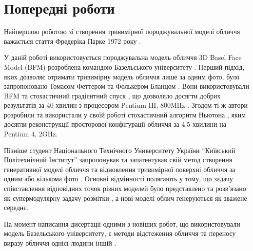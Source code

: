 \section{Попередні роботи}

Найпершою роботою зі створення
тривимірної породжувальної моделі обличчя важається
стаття Фредеріка Парке 1972 року \cite{Parke:1972}.

У даній роботі використовується породжувальна модель обличчя
3D Basel Face Model (BFM)
розроблена командою Базельського університету
\cite{bfm09}.
Перший підхід,
яких дозволяє отримати тривимірну модель обличчя лише за одним фото,
було запропоновано Томасом Феттером та Фолькером Бланцом
\cite{blanz:vetter:1999}.
Вони використовували BFM та стохастичний градієнтний спуск \cite{sgd:1998},
що дозволяло досягти добрих результатів за 40 хвилин з процесором
Pentium III, 800MHz \cite{blanz:romdhani:vetter}.
Згодом ті ж автори розробили та використали у своїй роботі
стохастичний алгоритм Ньютона \cite{blanz:vetter:2003},
яким досягли реконструкції просторової конфігурації обличчя за 4.5 хвилини на
Pentium 4, 2GHz.

Пізніше студент Національного Технічного Университету України
``Київський Політехнічний Інститут'' запропонував та запатентував
свій метод створення генеративної моделі обличчя та відновлення
тривимірної поверхні обличчя за одним або кількома фото \cite{tyshchenko2011}.
Основні відмінності полягають у тому,
що задачу співставлення відповідних точок різних моделей
було представлено та розв'язано як супермодулярну задачу розмітки
\cite{Rossi:2006:HCP:1207782},
а нові моделі облич генеруються як зважене середнє.

На момент написання дисертації одними з новіших робот,
що використовували модель Базельського університету,
є методи відстеження обличчя \cite{Saito2016}
та переносу виразу обличчя однієї людини іншій \cite{thies2016face}.
